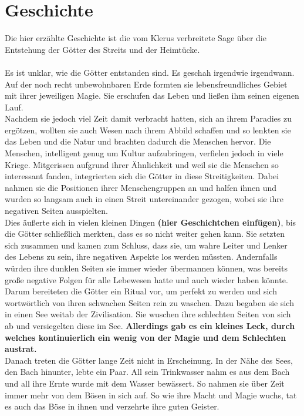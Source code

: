 \section{Geschichte}
Die hier erzählte Geschichte ist die vom Klerus verbreitete Sage über die Entstehung der Götter des Streits und der Heimtücke. \\\\
Es ist unklar, wie die Götter entstanden sind. 
Es geschah irgendwie irgendwann. 
Auf der noch recht unbewohnbaren Erde formten sie lebensfreundliches Gebiet mit ihrer jeweiligen Magie. 
Sie erschufen das Leben und ließen ihm seinen eigenen Lauf.\\
Nachdem sie jedoch viel Zeit damit verbracht hatten, sich an ihrem Paradies zu ergötzen, wollten sie auch Wesen nach ihrem Abbild schaffen und so lenkten sie das Leben und die Natur und brachten dadurch die Menschen hervor. 
Die Menschen, intelligent genug um Kultur aufzubringen, verfielen jedoch in viele Kriege. 
Mitgerissen aufgrund ihrer Ähnlichkeit und weil sie die Menschen so interessant fanden, integrierten sich die Götter in diese Streitigkeiten. 
Dabei nahmen sie die Positionen ihrer Menschengruppen an und halfen ihnen und wurden so langsam auch in einen Streit untereinander gezogen, wobei sie ihre negativen Seiten ausspielten.\\
Dies äußerte sich in vielen kleinen Dingen \textbf{(hier Geschichtchen einfügen)}, bis die Götter schließlich merkten, dass es so nicht weiter gehen kann. 
Sie setzten sich zusammen und kamen zum Schluss, dass sie, um wahre Leiter und Lenker des Lebens zu sein, ihre negativen Aspekte los werden müssten. 
Andernfalls würden ihre dunklen Seiten sie immer wieder übermannen können, was bereits große negative Folgen für alle Lebewesen hatte und auch wieder haben könnte.\\
Darum bereiteten die Götter ein Ritual vor, um perfekt zu werden und sich wortwörtlich von ihren schwachen Seiten rein zu waschen. 
Dazu begaben sie sich in einen See weitab der Zivilisation. 
Sie wuschen ihre schlechten Seiten von sich ab und versiegelten diese im See. 
\textbf{Allerdings gab es ein kleines Leck, durch welches kontinuierlich ein wenig von der Magie und dem Schlechten austrat.}\\
Danach treten die Götter lange Zeit nicht in Erscheinung. 
In der Nähe des Sees, den Bach hinunter, lebte ein Paar. 
All sein Trinkwasser nahm es aus dem Bach und all ihre Ernte wurde mit dem Wasser bewässert. 
So nahmen sie über Zeit immer mehr von dem Bösen in sich auf.
So wie ihre Macht und Magie wuchs, tat es auch das Böse in ihnen und verzehrte ihre guten Geister. 
